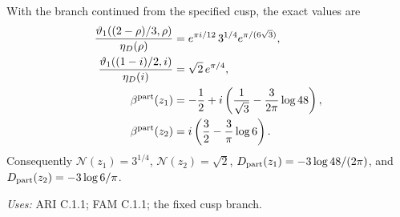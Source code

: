 \begin{proposition}\label{ari:C.1.2}
With the branch continued from the specified cusp, the exact values are
\begin{align*}
 \frac{\vartheta _1((2-\rho)/3,\rho)}{\eta_D(\rho)}
   &=e^{\pi i/12}\,3^{1/4}e^{\pi/(6\sqrt3)},\\
 \frac{\vartheta _1((1-i)/2,i)}{\eta_D(i)}
   &=\sqrt2\,e^{\pi/4},\\
 \beta^{\rm part}(z_1)
   &=-\frac12+i\left(\frac1{\sqrt3}-\frac3{2\pi}\log48\right),\\
 \beta^{\rm part}(z_2)
   &=i\left(\frac32-\frac3\pi\log6\right).
\end{align*}
Consequently $\mathcal N(z_1)=3^{1/4}$, $\mathcal N(z_2)=\sqrt2$,
$D_{\rm part}(z_1)=-3\log48/(2\pi)$, and
$D_{\rm part}(z_2)=-3\log6/\pi$.
\end{proposition}
\noindent\textit{Uses:} ARI C.1.1; FAM C.1.1; the fixed cusp branch.\par
